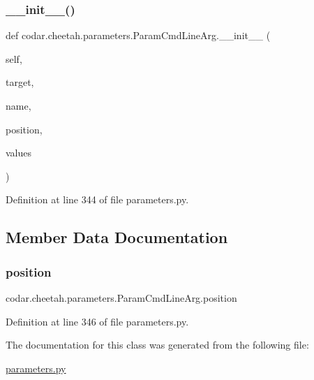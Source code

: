\subsubsection{\texorpdfstring{\+\_\+\+\_\+init\+\_\+\+\_\+()}{\_\_init\_\_()}}
{\footnotesize\ttfamily def codar.\+cheetah.\+parameters.\+Param\+Cmd\+Line\+Arg.\+\_\+\+\_\+init\+\_\+\+\_\+ (\begin{DoxyParamCaption}\item[{}]{self,  }\item[{}]{target,  }\item[{}]{name,  }\item[{}]{position,  }\item[{}]{values }\end{DoxyParamCaption})}



Definition at line 344 of file parameters.\+py.



\subsection{Member Data Documentation}
\mbox{\label{classcodar_1_1cheetah_1_1parameters_1_1_param_cmd_line_arg_a3fc6c85c37895ee7d710475090562ab8}} 
\subsubsection{\texorpdfstring{position}{position}}
{\footnotesize\ttfamily codar.\+cheetah.\+parameters.\+Param\+Cmd\+Line\+Arg.\+position}



Definition at line 346 of file parameters.\+py.



The documentation for this class was generated from the following file\+:\begin{DoxyCompactItemize}
\item 
\hyperlink{parameters_8py}{parameters.\+py}\end{DoxyCompactItemize}
